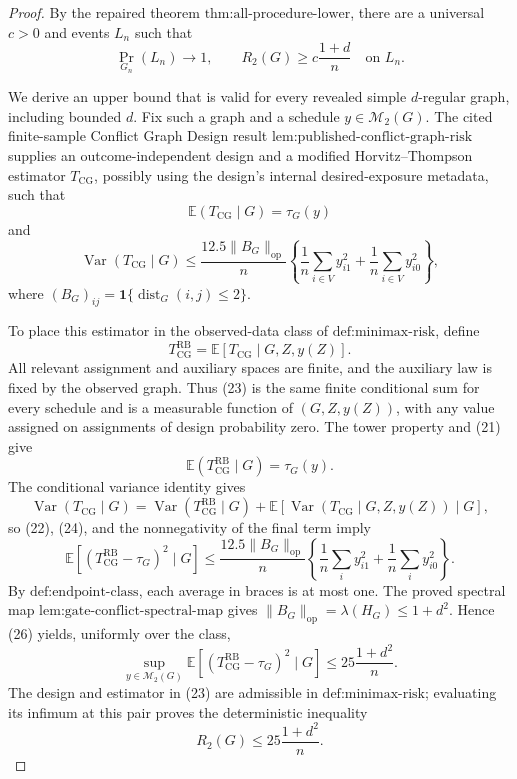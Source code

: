 \documentclass{article}
\begin{document}
\begin{proof}
By the repaired theorem \(\text{thm:all-procedure-lower}\), there are a universal \(c>0\) and events \(L_n\) such that
\[
\Pr_{G_n}(L_n)\longrightarrow1,
\qquad
R_2(G)\ge c\frac{1+d}{n}\quad\text{on }L_n. \tag{20}
\]

We derive an upper bound that is valid for every revealed simple \(d\)-regular graph, including bounded \(d\).  Fix such a graph and a schedule \(y\in\mathcal M_2(G)\).  The cited finite-sample Conflict Graph Design result \(\text{lem:published-conflict-graph-risk}\) supplies an outcome-independent design and a modified Horvitz--Thompson estimator \(T_{\mathrm{CG}}\), possibly using the design's internal desired-exposure metadata, such that
\[
\mathbb E(T_{\mathrm{CG}}\mid G)=\tau_G(y) \tag{21}
\]
and
\[
\operatorname{Var}(T_{\mathrm{CG}}\mid G)
\le \frac{12.5\|B_G\|_{\mathrm{op}}}{n}
\left\{\frac1n\sum_{i\in V}y_{i1}^2+
\frac1n\sum_{i\in V}y_{i0}^2\right\}, \tag{22}
\]
where \((B_G)_{ij}=\mathbf1\{\operatorname{dist}_G(i,j)\le2\}\).

To place this estimator in the observed-data class of \(\text{def:minimax-risk}\), define
\[
T_{\mathrm{CG}}^{\mathrm{RB}}
=\mathbb E[T_{\mathrm{CG}}\mid G,Z,y(Z)]. \tag{23}
\]
All relevant assignment and auxiliary spaces are finite, and the auxiliary law is fixed by the observed graph.  Thus (23) is the same finite conditional sum for every schedule and is a measurable function of \((G,Z,y(Z))\), with any value assigned on assignments of design probability zero.  The tower property and (21) give
\[
\mathbb E(T_{\mathrm{CG}}^{\mathrm{RB}}\mid G)=\tau_G(y). \tag{24}
\]
The conditional variance identity gives
\[
\operatorname{Var}(T_{\mathrm{CG}}\mid G)
=\operatorname{Var}(T_{\mathrm{CG}}^{\mathrm{RB}}\mid G)
+\mathbb E[\operatorname{Var}(T_{\mathrm{CG}}\mid G,Z,y(Z))\mid G], \tag{25}
\]
so (22), (24), and the nonnegativity of the final term imply
\[
\mathbb E[(T_{\mathrm{CG}}^{\mathrm{RB}}-\tau_G)^2\mid G]
\le \frac{12.5\|B_G\|_{\mathrm{op}}}{n}
\left\{\frac1n\sum_i y_{i1}^2+
\frac1n\sum_i y_{i0}^2\right\}. \tag{26}
\]
By \(\text{def:endpoint-class}\), each average in braces is at most one.  The proved spectral map \(\text{lem:gate-conflict-spectral-map}\) gives \(\|B_G\|_{\mathrm{op}}=\lambda(H_G)\le1+d^2\).  Hence (26) yields, uniformly over the class,
\[
\sup_{y\in\mathcal M_2(G)}
\mathbb E[(T_{\mathrm{CG}}^{\mathrm{RB}}-\tau_G)^2\mid G]
\le25\frac{1+d^2}{n}. \tag{27}
\]
The design and estimator in (23) are admissible in \(\text{def:minimax-risk}\); evaluating its infimum at this pair proves the deterministic inequality
\[
R_2(G)\le25\frac{1+d^2}{n}. \tag{28}
\]


\end{proof}
\end{document}
